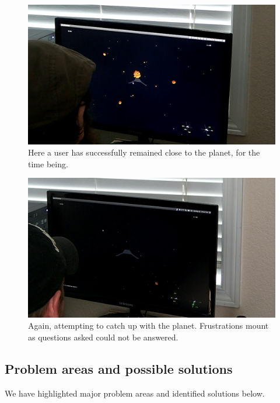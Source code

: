 \begin{figure}[H]
  \centering
  \includegraphics[width=1.0\textwidth]{images/ss4.jpg}
  \caption{Here a user has successfully remained close to the planet, for the time being.}
\end{figure}

\begin{figure}[H]
  \centering
  \includegraphics[width=1.0\textwidth]{images/ss5.jpg}
  \caption{Again, attempting to catch up with the planet.  Frustrations mount as questions asked could not be answered.}
\end{figure}

\subsection{Problem areas and possible solutions}

We have highlighted major problem areas and identified solutions below.


